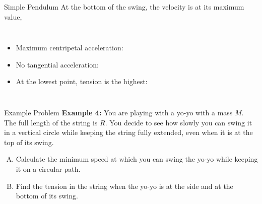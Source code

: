 \documentclass[12pt,compress,aspectratio=169]{beamer}
\newcommand{\mb}[1]{\ensuremath\mathbf{#1}}
\newcommand{\eq}[2]{\vspace{#1}{\Large\begin{displaymath}#2\end{displaymath}}}
\begin{document}
\begin{frame}{Simple Pendulum}
  At the bottom of the swing, the velocity is at its maximum value,
  
  \vspace{.1in}\begin{columns}

    \begin{itemize}
    \item Maximum centripetal acceleration:

      \eq{-.25in}{
        a_c=\frac{v^2}{r}
      }
    \item No tangential acceleration:

      \eq{-.25in}{
        a_t=0
      }
    \item At the lowest point, tension is the highest:

      \eq{-.3in}{
        T=w+F_c=m\left(g+\frac{v^2}{r}\right)
      }
    \end{itemize}
  \end{columns}
\end{frame}



\begin{frame}{Example Problem}
  \textbf{Example 4:} You are playing with a yo-yo with a mass $M$. The full
  length of the string is $R$. You decide to see how slowly you can swing it in
  a vertical circle while keeping the string fully extended, even when it is
  at the top of its swing.
  \begin{enumerate}[A.]
  \item Calculate the minimum speed at which you can swing the yo-yo while
    keeping it on a circular path.
  \item Find the tension in the string when the yo-yo is at the side and at the
    bottom of its swing. 
  \end{enumerate}
\end{frame}
\end{document}
